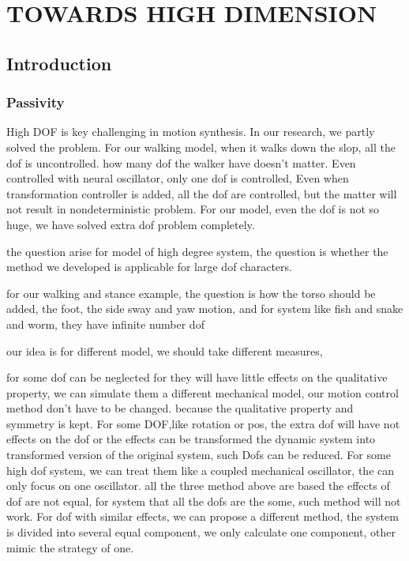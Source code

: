 \chapter{TOWARDS HIGH DIMENSION}
\label{chap:highdor}
\ifpdf
    \graphicspath{{BipedWalk/HiDofFigs/PNG/}{HiDof/HiDofFigs/PDF/}{HiDof/HiDofFigs/}}
\else
    \graphicspath{{HiDof/HiDofFigs/EPS/}{HiDof/HiDofFigs/}}
\fi
\section{Introduction}
\subsection*{Passivity}
High DOF is key challenging in motion synthesis.
In our research, we partly solved the problem.
For our walking model, when it walks down the slop, all the dof is uncontrolled.
how many dof the walker have doesn't matter.
Even controlled with neural oscillator, only one dof is controlled, 
Even when transformation controller is added, all the dof are controlled, but the matter will not result in nondeterministic problem.
For our model, even the dof is not so huge, we have solved extra dof problem completely.

the question arise for model of high degree system, the question is whether the method we developed is applicable for large dof characters.


for our walking and stance example, the question is how the torso should be added, the foot, the side sway and yaw motion, and for system like fish and snake and worm,
they have infinite number dof 

our idea is for different model, 
we should take different measures, 
\begin{itemize}

for some dof can be neglected for they will have little effects on the qualitative property, 
we can simulate them a different mechanical model, our motion control method don't have to be changed.
because the qualitative property and symmetry is kept.
For some DOF,like rotation or pos, the extra dof will have not effects on the dof or the effects can be transformed the dynamic system into transformed version of the original system, such Dofs can be reduced.
For some high dof system, we can treat them like a coupled mechanical oscillator, the can only focus on one oscillator.
all the three method above are based the effects of dof are not equal, for system that all the dofs are the some, such method will not work.
For dof with similar effects, we can propose a different method, the system is divided into several equal component, we only calculate one component, other mimic the strategy of one.
\end{itemize} 

